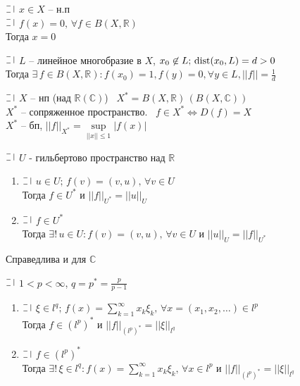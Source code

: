 \begin{sled}
  $\letus$ $x \in X$ -- н.п \\
  $\letus$ $f(x) = 0, \, \forall f \in B(X, \mathbb{R})$ \\
  Тогда $x = 0$
\end{sled}

\begin{sled}
  $\letus$ $L$ -- линейное многобразие в $X$, $x_0 \not \in L; \, \text{dist}(x_0, L) = d >0$\\ 
  Тогда $\exists \, f \in B(X, \mathbb{R}): f(x_0) = 1, f(y) = 0, \forall y \in L, ||f|| = \frac{1}{d}$
\end{sled}
  
\begin{definition}
  $\letus$ $X$ -- нп  (над  $\mathbb{R}(\mathbb{C})$) \
  $X^* = B(X, \mathbb{R}) \, (B(X, \mathbb{C}))$ \\
  $X^*$ -- сопряженное пространство. \ $f \in X^* \Longleftrightarrow D(f) = X$\\
  $X^*$ -- бп, $||f||_{X^*} = \sup\limits_{||x|| \le 1} |f(x)|$
\end{definition}

\begin{theorem}[Рисса 1]
  $\letus$ $U$ - гильбертово пространство над $\mathbb{R}$
  \begin{enumerate}
    \item $\letus$ $u \in U; \, f(v) = (v, u), \, \forall v \in U$\\
    Тогда $f \in U^*$ и $||f||_{U^*} = ||u||_U$
    \item $\letus$ $f \in U^*$\\
    Тогда $\exists! \, u\in U: f(v) = (v, u), \, \forall v \in U$ и $||u||_U = ||f||_{U^*}$
    \end{enumerate}
    Справедлива и для $\mathbb{C}$
\end{theorem}

\begin{theorem}[Рисса 2]
  $\letus$ $1 < p < \infty$, $q = p^* = \frac{p}{p-1}$
  \begin{enumerate}
    \item $\letus$ $\xi \in l^q; \, f(x) = \sum\limits_{k=1}^{\infty} x_k \xi_k, \, \forall x = (x_1, x_2, \dots) \in l^p$\\
    Тогда $f \in (l^p)^*$ и $||f||_{(l^p)^*} = ||\xi||_{l^q}$
    \item $\letus$ $f \in (l^p)^*$\\
    Тогда $\exists! \, \xi \in l^q: f(x) = \sum\limits_{k=1}^{\infty} x_k \xi_k, \, \forall x \in l^p$ 
    и $||f||_{(l^p)^*} = ||\xi||_{l^q}$
    \end{enumerate}
\end{theorem}

